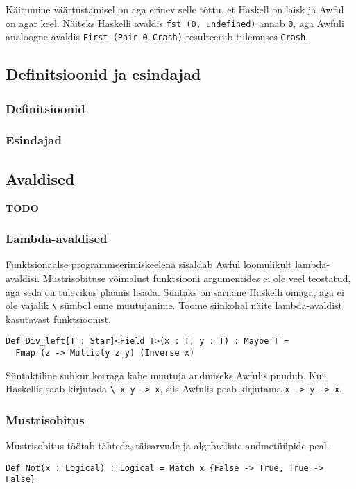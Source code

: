 \documentclass[12pt]{article}
\newcommand\markus[1]{\textcolor{roheline}{\textbf{#1}}}
\begin{document}
        Käitumine väärtustamisel on aga erinev selle tõttu, et Haskell on laisk ja Awful on agar keel. Näiteks Haskelli avaldis \verb!fst (0, undefined)! annab \verb!0!, aga Awfuli analoogne avaldis \verb!First (Pair 0 Crash)! resulteerub tulemuses \verb!Crash!.
    \subsection{Definitsioonid ja esindajad}
      
      \subsubsection{Definitsioonid}
        
      \subsubsection{Esindajad}
        
    \subsection{Avaldised}
      \markus{TODO}
      \subsubsection{Lambda-avaldised}
        Funktsionaalse programmeerimiskeelena sisaldab Awful loomulikult lambda-avaldisi. Mustrisobituse võimalust funktsiooni argumentides ei ole veel teostatud, aga seda on tulevikus plaanis lisada. Süntaks on sarnane Haskelli omaga, aga ei ole vajalik \verb!\! sümbol enne muutujanime. Toome siinkohal näite lambda-avaldist kasutavast funktsioonist.

        \begin{verbatim}Def Div_left[T : Star]<Field T>(x : T, y : T) : Maybe T =
  Fmap (z -> Multiply z y) (Inverse x)\end{verbatim}

        Süntaktiline suhkur korraga kahe muutuja andmiseks Awfulis puudub. Kui Haskellis saab kirjutada \verb!\ x y -> x!, siis Awfulis peab kirjutama \verb!x -> y -> x!.
      \subsubsection{Mustrisobitus}\label{match}
        Mustrisobitus töötab tähtede, täisarvude ja algebraliste andmetüüpide peal.

        \begin{verbatim}Def Not(x : Logical) : Logical = Match x {False -> True, True -> False}\end{verbatim}
\end{document}

